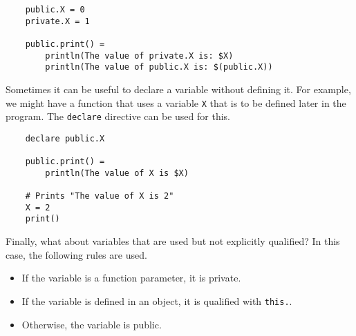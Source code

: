 \begin{verbatim}
    public.X = 0
    private.X = 1
    
    public.print() =
        println(The value of private.X is: $X)
        println(The value of public.X is: $(public.X))
\end{verbatim}
%
Sometimes it can be useful to declare a variable without defining it.  For example, we might have a
function that uses a variable \verb+X+ that is to be defined later in the program.  The
\verb+declare+ directive can be used for this.

\begin{verbatim}
    declare public.X

    public.print() =
        println(The value of X is $X)

    # Prints "The value of X is 2"
    X = 2
    print()
\end{verbatim}

Finally, what about variables that are used but not explicitly qualified?  In this case, the following rules are used.

\begin{itemize}
\item If the variable is a function parameter, it is private.
\item If the variable is defined in an object, it is qualified with \verb+this.+.
\item Otherwise, the variable is public.
\end{itemize}

